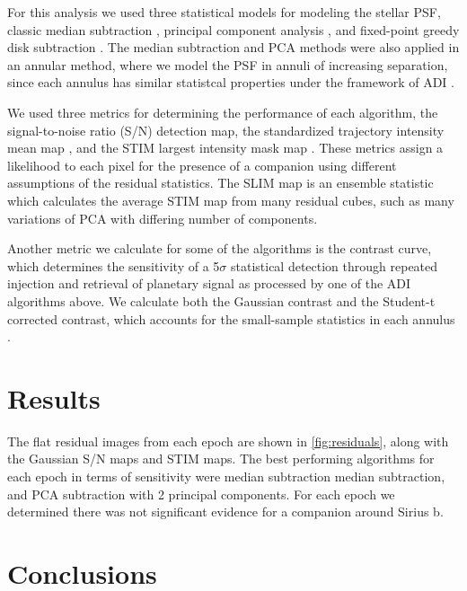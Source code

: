 \documentclass[twocolumn]{aastex631}
\begin{document}
For this analysis we used three statistical models for modeling the stellar PSF, classic median subtraction \citep{marois_angular_2006}, principal component analysis \citep[PCA;][]{soummer_detection_2012}, and fixed-point greedy disk subtraction \citep[GreeDS;][]{pairet_reference-less_2019,pairet_mayonnaise_2020}. The median subtraction and PCA methods were also applied in an annular method, where we model the PSF in annuli of increasing separation, since each annulus has similar statistcal properties under the framework of ADI \citep{marois_angular_2006}.

We used three metrics for determining the performance of each algorithm, the signal-to-noise ratio (S/N) detection map, the standardized trajectory intensity mean map \citep[STIM map;][]{pairet_stim_2019}, and the STIM largest intensity mask map \citep[SLIM map;][]{pairet_signal_2020}. These metrics assign a likelihood to each pixel for the presence of a companion using different assumptions of the residual statistics. The SLIM map is an ensemble statistic which calculates the average STIM map from many residual cubes, such as many variations of PCA with differing number of components.

Another metric we calculate for some of the algorithms is the contrast curve, which determines the sensitivity of a 5$\sigma$ statistical detection through repeated injection and retrieval of planetary signal as processed by one of the ADI algorithms above. We calculate both the Gaussian contrast and the Student-t corrected contrast, which accounts for the small-sample statistics in each annulus \citep{mawet_fundamental_2014}.

\section{Results} \label{sec:results}

The flat residual images from each epoch are shown in \autoref{fig:residuals}, along with the Gaussian S/N maps and STIM maps. The best performing algorithms for each epoch in terms of sensitivity were median subtraction median subtraction, and PCA subtraction with 2 principal components. For each epoch we determined there was not significant evidence for a companion around Sirius b.

\section{Conclusions} \label{sec:conclusion}


\begin{acknowledgments}

\end{acknowledgments}


{}

\end{document}
